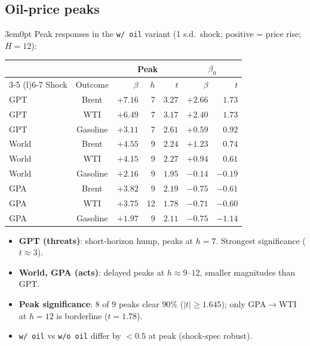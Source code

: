 \documentclass[12pt]{article}
\newenvironment{bodyL2}{\begin{adjustwidth}{3em}{0pt}}{\end{adjustwidth}}
\begin{document}
\subsection{Oil-price peaks}
\begin{bodyL2}
Peak responses in the \texttt{w/ oil} variant (1 s.d.\ shock; positive = price rise; $H = 12$):

\begin{center}
\renewcommand{\arraystretch}{1.15}
\begin{tabular}{lcrrr|rr}
\toprule
                & & \multicolumn{3}{c}{Peak} & \multicolumn{2}{c}{$\beta_0$} \\
\cmidrule(lr){3-5} \cmidrule(l){6-7}
Shock & Outcome  & $\beta$ & $h$ & $t$    & $\beta$ & $t$ \\
\midrule
GPT   & Brent    & $+7.16$ & 7  & $3.27$ & $+2.66$ & $1.73$ \\
GPT   & WTI      & $+6.49$ & 7  & $3.17$ & $+2.40$ & $1.73$ \\
GPT   & Gasoline & $+3.11$ & 7  & $2.61$ & $+0.59$ & $0.92$ \\
\midrule
World & Brent    & $+4.55$ & 9  & $2.24$ & $+1.23$ & $0.74$ \\
World & WTI      & $+4.15$ & 9  & $2.27$ & $+0.94$ & $0.61$ \\
World & Gasoline & $+2.16$ & 9  & $1.95$ & $-0.14$ & $-0.19$ \\
\midrule
GPA   & Brent    & $+3.82$ & 9  & $2.19$ & $-0.75$ & $-0.61$ \\
GPA   & WTI      & $+3.75$ & 12 & $1.78$ & $-0.71$ & $-0.60$ \\
GPA   & Gasoline & $+1.97$ & 9  & $2.11$ & $-0.75$ & $-1.14$ \\
\bottomrule
\end{tabular}
\end{center}

\smallskip
\begin{itemize}[label=$\bullet$, leftmargin=*]
    \item \textbf{GPT (threats)}: short-horizon hump, peaks at $h = 7$. Strongest significance ($t \approx 3$).
    \item \textbf{World, GPA (acts)}: delayed peaks at $h \approx 9$--$12$, smaller magnitudes than GPT.
    \item \textbf{Peak significance}: 8 of 9 peaks clear $90\%$ ($|t| \ge 1.645$); only GPA$\to$WTI at $h=12$ is borderline ($t = 1.78$).
    \item \texttt{w/ oil} vs \texttt{w/o oil} differ by $< 0.5$ at peak (shock-spec robust).
\end{itemize}


\end{bodyL2}
\end{document}
